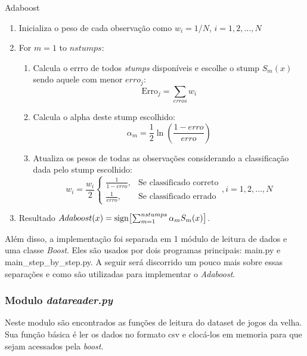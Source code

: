 \begin{algorithm}[htb]
	\caption{Adaboost}
  \begin{enumerate}
    \item Inicializa o peso de cada observação como $w_i = 1/N$, $i = 1, 2, \dots, N$
		
    \item
    For $m = 1$ to $nstumps$:
    \begin{enumerate}
      \item Calcula o errro de todos \emph{stumps} disponíveis  e escolhe o stump $S_m(x)$ sendo aquele com menor $erro_j$:
			 \[
        \text{Erro}_{j}=  \sum_{erros} w_i %
      \]

      \item Calcula o alpha deste stump escolhido: 
			 \[
					\alpha_m = \frac{1}{2}\ln(\frac{1 - erro}{erro})
      \]
      \item Atualiza os pesos de todas as observações considerando a classificação dada pelo stump escolhido:
			 \[
				 w_i  = \frac{w_i}{2} \begin{cases} \frac{1}{1 - erro}, & \mbox{Se classificado correto}  \\ \frac{1}{erro}, & \mbox{Se classificado errado} \end{cases}, i = 1,2, \dots, N
       \]
    \end{enumerate}

  \item
  Resultado $Adaboost(x) = \operatorname{sign} \bigl[ \sum_{m = 1}^{nstumps} \alpha_m S_m(x) \bigr]$.
  \end{enumerate}
	\label{pseudocode:adaboost}
\end{algorithm}


Além disso, a implementação foi separada em 1 módulo de leitura de dados e uma classe \emph{Boost}. Eles são usados por dois programas principais: main.py e main\_step\_by\_step.py. A seguir será discorrido um pouco mais sobre essas separações e como são utilizadas para implementar o \emph{Adaboost}.

\subsubsection{Modulo \emph{datareader.py}}
Neste modulo são encontrados as funções de leitura do dataset de jogos da velha. Sua função básica é ler os dados no formato csv e clocá-los em memoria para que sejam acessados pela \emph{boost}.

